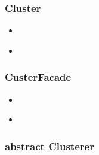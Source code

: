 	\subsubsection{Cluster}
	
	
	\begin{itemize}
		\item 
		\begin{description}
			\item 
		\end{description}
	\end{itemize}
	\begin{itemize}
		\item 
		\begin{description}
			\item 
		\end{description}
	\end{itemize}
	
	
	
	\subsubsection{CusterFacade}
	
	
	\begin{itemize}
		\item 
		\begin{description}
			\item 
		\end{description}
	\end{itemize}
	\begin{itemize}
		\item 
		\begin{description}
			\item 
		\end{description}
	\end{itemize}
	
	
	
	
	\subsubsection{abstract Clusterer}
	
